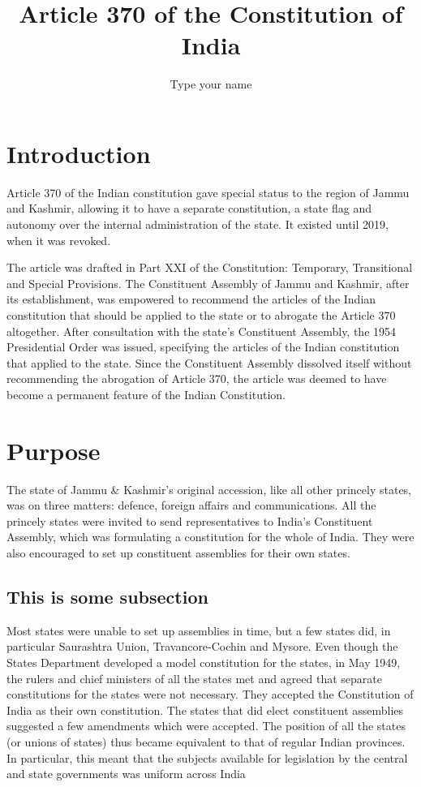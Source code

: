 \documentclass[a4paper,onecolumn]{article}
\title{Article 370 of the Constitution of India}
\author{Type your name}
\begin{document}
\maketitle

\tableofcontents %

\section{Introduction}
Article 370 of the Indian constitution gave special status to the region of Jammu and Kashmir, allowing it to have a separate constitution, a state flag and autonomy over the internal administration of the state. It existed until 2019, when it was revoked.

The article was drafted in Part XXI of the Constitution: Temporary, Transitional and Special Provisions. The Constituent Assembly of Jammu and Kashmir, after its establishment, was empowered to recommend the articles of the Indian constitution that should be applied to the state or to abrogate the Article 370 altogether. After consultation with the state's Constituent Assembly, the 1954 Presidential Order was issued, specifying the articles of the Indian constitution that applied to the state. Since the Constituent Assembly dissolved itself without recommending the abrogation of Article 370, the article was deemed to have become a permanent feature of the Indian Constitution.

\section{Purpose}
The state of Jammu \& Kashmir's original accession, like all other princely states, was on three matters: defence, foreign affairs and communications. All the princely states were invited to send representatives to India's Constituent Assembly, which was formulating a constitution for the whole of India. They were also encouraged to set up constituent assemblies for their own states.

	\subsection{This is some subsection}
	 Most states were unable to set up assemblies in time, but a few states did, in particular Saurashtra Union, Travancore-Cochin and Mysore. Even though the States Department developed a model constitution for the states, in May 1949, the rulers and chief ministers of all the states met and agreed that separate constitutions for the states were not necessary. They accepted the Constitution of India as their own constitution. The states that did elect constituent assemblies suggested a few amendments which were accepted. The position of all the states (or unions of states) thus became equivalent to that of regular Indian provinces. In particular, this meant that the subjects available for legislation by the central and state governments was uniform across India
	 
\end{document}
